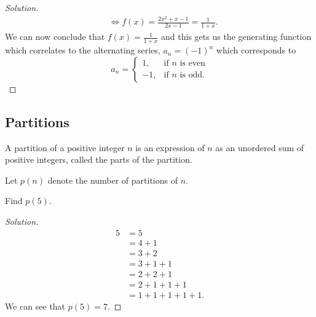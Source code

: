 \documentclass[10pt, a4paper]{article}
\begin{document}
\begin{example}
\begin{proof}[Solution]
\begin{align*}
        &\iff f(x) = \frac{2x ^ 2 + x - 1}{2x - 1} = \frac{1}{1 + x}.
        \end{align*}
        We can now conclude that $f(x) = \frac{1}{1 + x}$
        and this gets us the generating function which correlates to the alternating series,
        $a_n = (-1) ^ {n}$
        which corresponds to
        \[
        a_n = \begin{cases}
            1, & \text{if $n$ is even} \\
            -1, & \text{if $n$ is odd}.
        \end{cases}
        \]
    \end{proof}
\end{example}

\subsection{Partitions}
A partition of a positive integer $n$ is an expression of $n$ as an unordered sum of positive integers,
called the parts of the partition.

Let $p(n)$ denote the number of partitions of $n$.
\begin{example}
    Find $p(5)$.
    \begin{proof}[Solution]\renewcommand{\qedsymbol}{}
        \begin{align*}
            5 &= 5 \\
            &= 4 + 1 \\
            &= 3 + 2 \\
            &= 3 + 1 + 1 \\
            &= 2 + 2 + 1 \\
            &= 2 + 1 + 1 + 1 \\
            &= 1 + 1 + 1 + 1 + 1.
        \end{align*}
        We can see that $p(5) = 7$.
    \end{proof}
\end{example}
\end{document}
